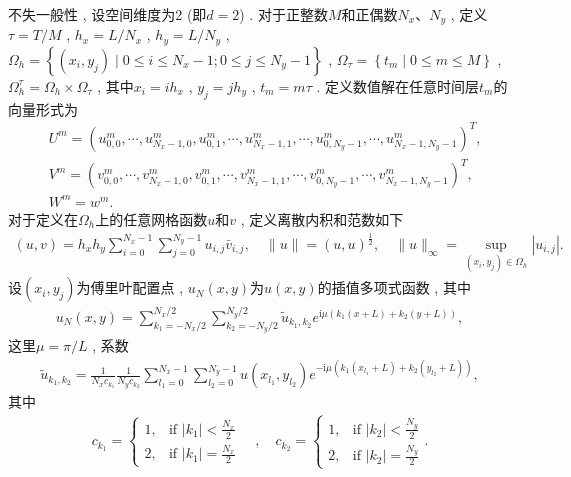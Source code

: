 不失一般性 , 设空间维度为2 (即$d=2$) . 对于正整数$M$和正偶数$N_{x}$、$N_{y}$ , 定义$\tau={T}/{M}$ , $h_{x}={L}/{N_{x}}$ , $h_{y}={L}/{N_{y}}$ , 
$\Omega_{h}=\left\{(x_{i} , y_{j}) \mid 0 \leq i \leq N_x-1;0 \leq j \leq N_y-1\right\}$ , $\Omega_{\tau}=\left\{t_{m} \mid 0 \leq m \leq M\right\}$ , $\Omega_{h}^{\tau}=\Omega_{h} \times \Omega_{\tau}$ , 
其中$x_{i}=i h_{x}$ , $y_{j}=j h_{y}$ , $t_{m}=m \tau$ . 
定义数值解在任意时间层$t_m$的向量形式为
\begin{align}\label{eq_SAVRRK:47}
&U^m=\left(u_{0 , 0}^m , \cdots , u_{N_{x}-1 , 0}^m , u_{0 , 1}^m , \cdots , u_{N_{x}-1 , 1}^m , \cdots , u_{0 , N_{y}-1}^m , \cdots , u_{N_{x}-1 , N_{y}-1}^m\right)^{T} , \\
&V^m=\left(v_{0 , 0}^m , \cdots , v_{N_{x}-1 , 0}^m , v_{0 , 1}^m , \cdots , v_{N_{x}-1 , 1}^m , \cdots , v_{0 , N_{y}-1}^m , \cdots , v_{N_{x}-1 , N_{y}-1}^m\right)^{T} , \\
&W^m=w^m . 
\end{align}
对于定义在$\Omega_{h}$上的任意网格函数$u$和$v$ , 定义离散内积和范数如下
\begin{align}\label{eq_SAVRRK:48}
(u , v)=h_{x} h_{y} \sum_{i=0}^{N_{x}-1} \sum_{j=0}^{N_{y}-1} u_{i , j} \bar{v}_{i , j} , \quad\|u\|=(u , u)^{\frac{1}{2}} , \quad\|u\|_{\infty}=\sup _{\left(x_{i} , y_{j}\right) \in \Omega_{h}}\left|u_{i , j}\right| . 
\end{align}
设$\left(x_{i} , y_{j}\right)$为傅里叶配置点 , $u_{N}(x , y)$为$u(x , y)$的插值多项式函数 , 其中
\begin{align}\label{eq_SAVRRK:50}
u_{N}(x , y)=\sum_{k_{1}=-N_{x} / 2}^{N_{x} / 2} \sum_{k_{2}=-N_{y} / 2}^{N_{y} / 2} \tilde{u}_{k_{1} , k_{2}} e^{\mathrm{i}\mu\left( k_{1} (x+L)+k_{2}(y+L)\right)} , 
\end{align}
这里$\mu={\pi}/{L}$ , 系数
\begin{align}\label{eq_SAVRRK:51}
\tilde{u}_{k_{1} , k_{2}}=\frac{1}{N_{x} c_{k_{1}}} \frac{1}{N_{y} c_{k_{2}}} \sum_{l_1=0}^{N_{x}-1} \sum_{l_2=0}^{N_{y}-1} u(x_{l_1} , y_{l_2}) e^{-\mathrm{i}\mu\left( k_{1}(x_{l_1}+L)+k_{2}(y_{l_2}+L)\right)} , 
\end{align}
其中
\begin{align}c_{k_1} = \begin{cases} 1 , & \text{if } |k_1| < \frac{N_x}{2} \\ 2 , & \text{if } |k_1| = \frac{N_x}{2} \end{cases} \quad  , \quad c_{k_2} = \begin{cases} 1 , & \text{if } |k_2| < \frac{N_y}{2} \\ 2 , & \text{if } |k_2| = \frac{N_y}{2} \end{cases} . \end{align}
